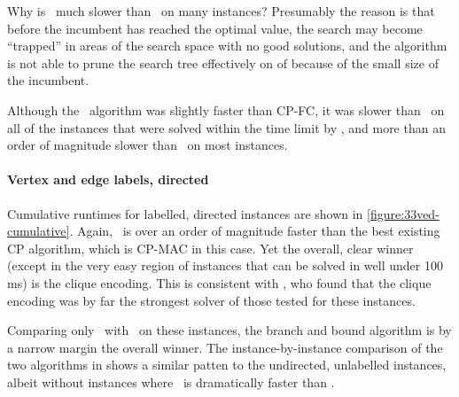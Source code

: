 Why is \McSplit\ much slower than \McSplitDown\ on many instances?  Presumably
the reason is that before the incumbent has reached the optimal value,
the search may become ``trapped'' in areas of the search space with no good solutions,
and the algorithm is not able to prune the search tree effectively
on  of  because of the
small size of the incumbent.

Although the \kDown\ algorithm was slightly faster than CP-FC, it was slower
than \McSplitDown\ on all of the instances that were solved within the time
limit by \kDown, and more than an order of magnitude slower than \McSplitDown\
on most instances.








\paragraph{Vertex and edge labels, directed} Cumulative runtimes for labelled,
directed instances are shown in \cref{figure:33ved-cumulative}. Again, \McSplit\ is over
an order of magnitude faster than the best existing CP algorithm, which is
CP-MAC in this case. Yet the overall, clear winner
(except in the very easy region of instances that can be solved in well under 100 ms)
is the clique encoding.  This is consistent with
\citet{DBLP:conf/cp/McCreeshNPS16}, who found that the clique encoding was by far
the strongest solver of those tested for these instances.

Comparing only \McSplit\ with \McSplitDown\ on these instances, the branch and bound
algorithm is by a narrow margin the overall winner.  The instance-by-instance
comparison of the two algorithms in \Cref{figure:33ved-scatter} shows a similar patten
to the undirected, unlabelled instances, albeit without instances where \McSplitDown\
is dramatically faster than \McSplit.

